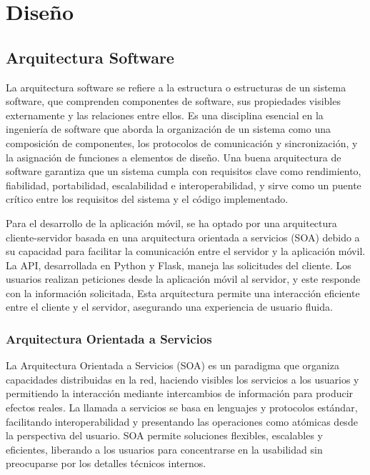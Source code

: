 \chapter{Diseño}

\section{Arquitectura Software}

La arquitectura software se refiere a la estructura o estructuras de un sistema software, que comprenden componentes de software, sus propiedades visibles externamente y las relaciones entre ellos. Es una disciplina esencial en la ingeniería de software que aborda la organización de un sistema como una composición de componentes, los protocolos de comunicación y sincronización, y la asignación de funciones a elementos de diseño. Una buena arquitectura de software garantiza que un sistema cumpla con requisitos clave como rendimiento, fiabilidad, portabilidad, escalabilidad e interoperabilidad, y sirve como un puente crítico entre los requisitos del sistema y el código implementado. \cite{garlan}

Para el desarrollo de la aplicación móvil, se ha optado por una arquitectura cliente-servidor basada en una arquitectura orientada a servicios (SOA) debido a su capacidad para facilitar la comunicación entre el servidor y la aplicación móvil. La API, desarrollada en Python y Flask, maneja las solicitudes del cliente. Los usuarios realizan peticiones desde la aplicación móvil al servidor, y este responde con la información solicitada, Esta arquitectura permite una interacción eficiente entre el cliente y el servidor, asegurando una experiencia de usuario fluida.


\subsection{Arquitectura Orientada a Servicios}

La Arquitectura Orientada a Servicios (SOA) es un paradigma que organiza capacidades distribuidas en la red, haciendo visibles los servicios a los usuarios y permitiendo la interacción mediante intercambios de información para producir efectos reales. La llamada a servicios se basa en lenguajes y protocolos estándar, facilitando interoperabilidad y presentando las operaciones como atómicas desde la perspectiva del usuario. SOA permite soluciones flexibles, escalables y eficientes, liberando a los usuarios para concentrarse en la usabilidad sin preocuparse por los detalles técnicos internos. \cite{laskey}

